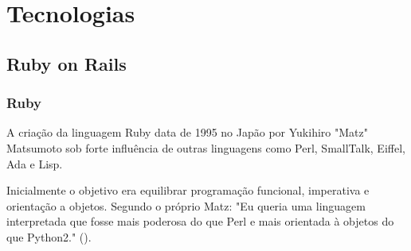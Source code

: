 \chapter{Tecnologias}
\label{cap:tecnologias}
\section{Ruby on Rails}
\subsection{Ruby}
    \par A criação da linguagem Ruby data de 1995 no Japão por Yukihiro "Matz" Matsumoto sob forte influência de outras linguagens como Perl, SmallTalk, Eiffel, Ada e Lisp.
    \par Inicialmente o objetivo era equilibrar programação funcional, imperativa e orientação a objetos. Segundo o próprio Matz: "Eu queria uma linguagem interpretada que fosse mais poderosa do que Perl e mais orientada à objetos do que Python2." (\cite{rubydocs}).
